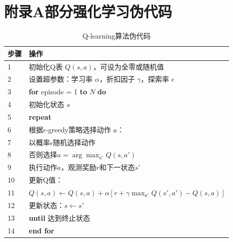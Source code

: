 \chapter*{附录A\quad 部分强化学习伪代码}\label{附录A}	


\setcounter{equation}{0}
\setcounter{figure}{0}
\setcounter{table}{0} 
\renewcommand{\theequation}{A-\arabic{equation}}
\renewcommand{\thefigure}{A-\arabic{figure}}
\renewcommand{\thetable}{A-\arabic{table}}
\begin{table}[htbp]
\centering
\caption{Q-learning算法伪代码}
\begin{tabular}{lp{}}
\toprule
\textnormal{步骤} & \textnormal{操作} \\
\midrule
1 & 初始化Q表 $Q(s,a)$，可设为全零或随机值 \\
2 & 设置超参数：学习率 $\alpha$，折扣因子 $\gamma$，探索率 $\epsilon$ \\
3 & \textbf{for} episode = 1 \textbf{to} $N$ \textbf{do} \\
4 & \quad 初始化状态 $s$ \\
5 & \quad \textbf{repeat} \\
6 & \quad\quad 根据$\epsilon$-greedy策略选择动作 $a$： \\
7 & \quad\quad \quad 以概率$\epsilon$随机选择动作 \\
8 & \quad\quad \quad 否则选择$a = \arg\max_{a'} Q(s, a')$ \\
9 & \quad\quad 执行动作$a$，观测奖励$r$和下一状态$s'$ \\
10 & \quad\quad 更新Q值： \\
11 & \quad\quad $Q(s,a) \leftarrow Q(s,a) + \alpha\left[r + \gamma \max_{a'} Q(s',a') - Q(s,a)\right]$ \\
12 & \quad\quad 更新状态：$s \leftarrow s'$ \\
13 & \quad \textbf{until} 达到终止状态 \\
14 & \textbf{end for} \\
\bottomrule
\end{tabular}
\end{table}

